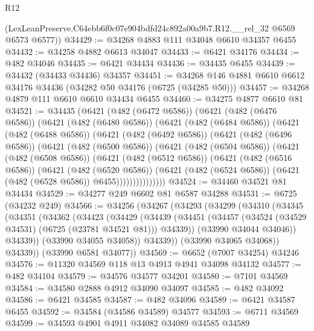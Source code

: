 \begin{lexlean}{R12}
\begin{coremodule}
      (LexLeanPreserve.C64ebb6f0c07e904bdfd24c892a00a9b7.R12.__rel_32 @6569 @6573 @6577))
@34429 := @34268 @4883 @111 @34048 @6610 @34357 @6455
@34432 := @34258 @4882 @6613 @34047
@34433 := @6421 @34176
@34434 := @482 @34046
@34435 := @6421 @34434
@34436 := @34435 @6455
@34439 := @34432 (@34433 @34436) @34357
@34451 := @34268 @146 @4881 @6610 @6612 @34176 @34436 (@34282 @50 @34176 (@6725 (@34285 @50)))
@34457 := @34268 @4879 @111 @6610 @6610 @34434 @6455
@34460 := @34275 @4877 @6610 @81
@34521 := @34435
    (@6421
      (@482 (@6472 @6586))
      (@6421
        (@482 (@6476 @6586))
        (@6421
          (@482 (@6480 @6586))
          (@6421
            (@482 (@6484 @6586))
            (@6421
              (@482 (@6488 @6586))
              (@6421
                (@482 (@6492 @6586))
                (@6421
                  (@482 (@6496 @6586))
                  (@6421
                    (@482 (@6500 @6586))
                    (@6421
                      (@482 (@6504 @6586))
                      (@6421
                        (@482 (@6508 @6586))
                        (@6421
                          (@482 (@6512 @6586))
                          (@6421
                            (@482 (@6516 @6586))
                            (@6421
                              (@482 (@6520 @6586))
                              (@6421
                                (@482 (@6524 @6586))
                                (@6421 (@482 (@6528 @6586)) @6455)))))))))))))))
@34524 := @34460 @34521 @81 @34434
@34529 := @34277 @249 @6602 @81 @6587 @34288
@34531 := @6725 (@34232 @249)
@34566 := @34256
    (@34267
      (@34293
        (@34299
          (@34310
            (@34345
              (@34351
                (@34362
                  (@34423
                    (@34429
                      (@34439
                        (@34451
                          (@34457 (@34524 (@34529 @34531) (@6725 (@23781 @34521 @81))) @34339))
                        (@33990 @34044 @34046))
                      @34339))
                  (@33990 @34055 @34058))
                @34339))
            (@33990 @34065 @34068))
          @34339))
      (@33990 @6581 @34077))
@34569 := @6652 (@7007 @34254) @34246
@34576 := @11320 @34569 @118 @13 @4913 @4941 @34098 @34132
@34577 := @482 @34104
@34579 := @34576 @34577 @34201
@34580 := @7101 @34569
@34584 := @34580 @2888 @4912 @34090 @34097
@34585 := @482 @34092
@34586 := @6421 @34585
@34587 := @482 @34096
@34589 := @6421 @34587 @6455
@34592 := @34584 (@34586 @34589) @34577
@34593 := @6711 @34569
@34599 := @34593 @4901 @4911 @34082 @34089 @34585 @34589

\end{coremodule}
\end{lexlean}
